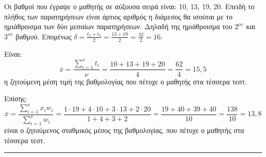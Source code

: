     \begin{alist}
        \item Οι βαθμοί που έγραψε ο μαθητής σε αύξουσα σειρά είναι: 10, 13, 19, 20.
        Επειδή το πλήθος των παρατηρήσεων είναι άρτιος αριθμός η διάμεσος θα ισούται με το ημιάθροισμα των δύο μεσαίων παρατηρήσεων. Δηλαδή της ημιάθροισμα του $2^{\text{ου}}$ και $3^{\text{ου}}$ βαθμού. Επομένως $\delta = \frac{t_2 + t_3}{2} = \frac{13+19}{2} = \frac{32}{2} = 16$.
        
        \item Είναι:
        \[ \bar{x} = \frac{\sum_{i=1}^{\nu} t_i}{\nu} = \frac{10+13+19+20}{4} = \frac{62}{4} = 15,5 \]
        η ζητούμενη μέση τιμή της βαθμολογίας που πέτυχε ο μαθητής στα τέσσερα τεστ.
        
        \item Επίσης:
        \[ \bar{x} = \frac{\sum_{i=1}^{\nu} x_i w_i}{\sum_{i=1}^{\nu} w_i} = \frac{1 \cdot 19 + 4 \cdot 10 + 3 \cdot 13 + 2 \cdot 20}{1+4+3+2} = \frac{19+40+39+40}{10} = \frac{138}{10} = 13,8 \]
        είναι ο ζητούμενος σταθμικός μέσος της βαθμολογίας, που πέτυχε ο μαθητής στα τέσσερα τεστ.
    \end{alist}
\vspace{6mm}
\noindent\rule{\textwidth}{0.4pt}
\vspace{6mm}


